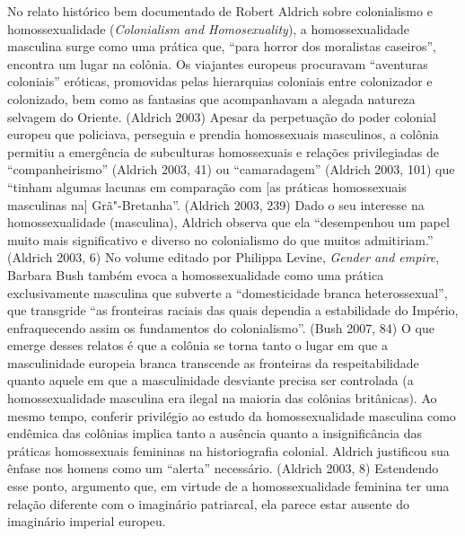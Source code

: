No relato histórico bem documentado de Robert Aldrich sobre colonialismo
e homossexualidade (\emph{Colonialism and Homosexuality}), a
homossexualidade masculina surge como uma prática que, ``para horror dos
moralistas caseiros'', encontra um lugar na colônia. Os viajantes
europeus procuravam ``aventuras coloniais'' eróticas, promovidas pelas
hierarquias coloniais entre colonizador e colonizado, bem como as
fantasias que acompanhavam a alegada natureza selvagem do Oriente.
(Aldrich 2003) Apesar da perpetuação do poder colonial europeu que
policiava, perseguia e prendia homossexuais masculinos, a colônia
permitiu a emergência de subculturas homossexuais e relações
privilegiadas de ``companheirismo'' (Aldrich 2003, 41) ou ``camaradagem''
(Aldrich 2003, 101) que ``tinham algumas lacunas em comparação com {[}as
práticas homossexuais masculinas na{]} Grã"-Bretanha''. (Aldrich 2003,
239) Dado o seu interesse na homossexualidade (masculina), Aldrich
observa que ela ``desempenhou um papel muito mais significativo e
diverso no colonialismo do que muitos admitiriam.'' (Aldrich 2003, 6) No
volume editado por Philippa Levine, \emph{Gender and empire}, Barbara
Bush também evoca a homossexualidade como uma prática exclusivamente
masculina que subverte a ``domesticidade branca heterossexual'', que
transgride ``as fronteiras raciais das quais dependia a estabilidade do
Império, enfraquecendo assim os fundamentos do colonialismo''. (Bush
2007, 84) O que emerge desses relatos é que a colônia se torna tanto o
lugar em que a masculinidade europeia branca transcende as fronteiras da
respeitabilidade quanto aquele em que a masculinidade desviante precisa
ser controlada (a homossexualidade masculina era ilegal na maioria das
colônias britânicas). Ao mesmo tempo, conferir privilégio ao estudo da
homossexualidade masculina como endêmica das colônias implica tanto a
ausência quanto a insignificância das práticas homossexuais femininas na
historiografia colonial. Aldrich justificou sua ênfase nos homens como
um ``alerta'' necessário. (Aldrich 2003, 8) Estendendo esse ponto,
argumento que, em virtude de a homossexualidade feminina ter uma relação
diferente com o imaginário patriarcal, ela parece estar ausente do
imaginário imperial europeu.

